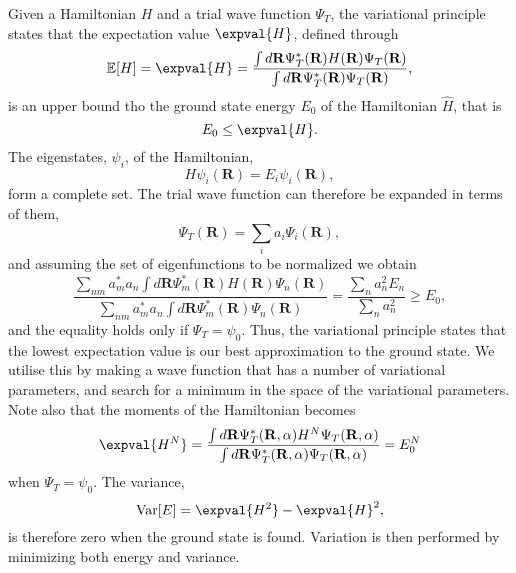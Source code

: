 Given a Hamiltonian $H$ and a trial wave function $\Psi_T$, the variational principle states that the expectation value $\expval{H}$, defined through
\begin{equation}
    \mathbb{E}[H]=\expval{H}= \frac{\int d\mathbf{R}\Psi_T^*(\mathbf{R})H(\mathbf{R})\Psi_T(\mathbf{R})}{\int d\mathbf{R}\Psi_T^*(\mathbf{R})\Psi_T(\mathbf{R})}, 
\end{equation}
is an upper bound tho the ground state energy $E_0$ of the Hamiltonian $\hat{H}$, that is 
\begin{equation}
    E_0 \leq \expval{H}.
\end{equation}
The eigenstates, $\psi_i$, of the Hamiltonian,
\begin{equation}
    H\psi_i(\mathbf{R}) = E_i\psi_i(\mathbf{R}), 
\end{equation}
form a complete set. The trial wave function can therefore be expanded in terms of them,
\begin{equation}
    \Psi_T(\mathbf{R}) = \sum_i a_i\Psi_i(\mathbf{R}), 
\end{equation}
and assuming the set of eigenfunctions to be normalized we obtain
\begin{equation}
    \frac{\sum_{nm}a_m^*a_n\int d\mathbf{R}\Psi_m^*(\mathbf{R})H(\mathbf{R})\Psi_n(\mathbf{R})}{\sum_{nm}a_m^*a_n\int d\mathbf{R}\Psi_m^*(\mathbf{R})\Psi_n(\mathbf{R})} = \frac{\sum_n a_n^2E_n}{\sum_n a_n^2} \geq E_0, 
\end{equation}
and the equality holds only if $\Psi_T = \psi_0$. Thus, the variational principle states that the lowest expectation value is our best approximation to the ground state. We utilise this by making a wave function that has a number of variational parameters, and search for a minimum in the space of the variational parameters. Note also that the moments of the Hamiltonian becomes
\begin{equation}
    \expval{H^N} = \frac{\int d\mathbf{R}\Psi_T^*(\mathbf{R}, \mathbf{\alpha})H^N\Psi_T(\mathbf{R},\mathbf{\alpha})}{\int d\mathbf{R}\Psi_T^*(\mathbf{R}, \mathbf{\alpha})\Psi_T(\mathbf{R}, \mathbf{\alpha})} = E_0^N
\end{equation}
when $\Psi_T=\psi_0$. The variance, 
\begin{equation}
    \text{Var}[E] = \expval{H^2}-\expval{H}^2, 
\end{equation}
is therefore zero when the ground state is found. Variation is then performed by minimizing both energy and variance. 



